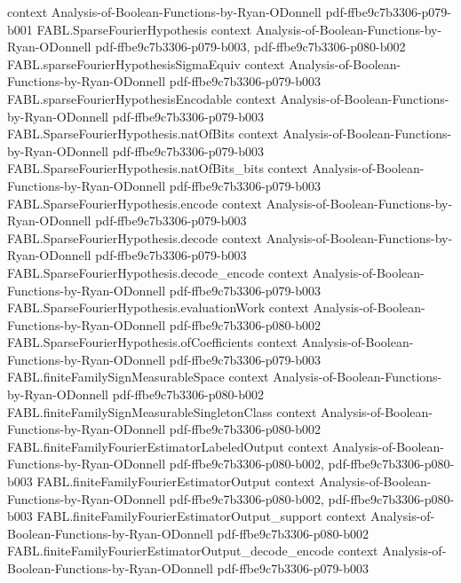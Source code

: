 \begin{theorem}
  {context}
  {Analysis-of-Boolean-Functions-by-Ryan-ODonnell}
  {pdf-ffbe9c7b3306-p079-b001}
\proofstep
  {FABL.SparseFourierHypothesis}
  {context}
  {Analysis-of-Boolean-Functions-by-Ryan-ODonnell}
  {pdf-ffbe9c7b3306-p079-b003,
    pdf-ffbe9c7b3306-p080-b002}
\proofstep
  {FABL.sparseFourierHypothesisSigmaEquiv}
  {context}
  {Analysis-of-Boolean-Functions-by-Ryan-ODonnell}
  {pdf-ffbe9c7b3306-p079-b003}
\proofstep
  {FABL.sparseFourierHypothesisEncodable}
  {context}
  {Analysis-of-Boolean-Functions-by-Ryan-ODonnell}
  {pdf-ffbe9c7b3306-p079-b003}
\proofstep
  {FABL.SparseFourierHypothesis.natOfBits}
  {context}
  {Analysis-of-Boolean-Functions-by-Ryan-ODonnell}
  {pdf-ffbe9c7b3306-p079-b003}
\proofstep
  {FABL.SparseFourierHypothesis.natOfBits_bits}
  {context}
  {Analysis-of-Boolean-Functions-by-Ryan-ODonnell}
  {pdf-ffbe9c7b3306-p079-b003}
\proofstep
  {FABL.SparseFourierHypothesis.encode}
  {context}
  {Analysis-of-Boolean-Functions-by-Ryan-ODonnell}
  {pdf-ffbe9c7b3306-p079-b003}
\proofstep
  {FABL.SparseFourierHypothesis.decode}
  {context}
  {Analysis-of-Boolean-Functions-by-Ryan-ODonnell}
  {pdf-ffbe9c7b3306-p079-b003}
\proofstep
  {FABL.SparseFourierHypothesis.decode_encode}
  {context}
  {Analysis-of-Boolean-Functions-by-Ryan-ODonnell}
  {pdf-ffbe9c7b3306-p079-b003}
\proofstep
  {FABL.SparseFourierHypothesis.evaluationWork}
  {context}
  {Analysis-of-Boolean-Functions-by-Ryan-ODonnell}
  {pdf-ffbe9c7b3306-p080-b002}
\proofstep
  {FABL.SparseFourierHypothesis.ofCoefficients}
  {context}
  {Analysis-of-Boolean-Functions-by-Ryan-ODonnell}
  {pdf-ffbe9c7b3306-p079-b003}
\proofstep
  {FABL.finiteFamilySignMeasurableSpace}
  {context}
  {Analysis-of-Boolean-Functions-by-Ryan-ODonnell}
  {pdf-ffbe9c7b3306-p080-b002}
\proofstep
  {FABL.finiteFamilySignMeasurableSingletonClass}
  {context}
  {Analysis-of-Boolean-Functions-by-Ryan-ODonnell}
  {pdf-ffbe9c7b3306-p080-b002}
\proofstep
  {FABL.finiteFamilyFourierEstimatorLabeledOutput}
  {context}
  {Analysis-of-Boolean-Functions-by-Ryan-ODonnell}
  {pdf-ffbe9c7b3306-p080-b002,
    pdf-ffbe9c7b3306-p080-b003}
\proofstep
  {FABL.finiteFamilyFourierEstimatorOutput}
  {context}
  {Analysis-of-Boolean-Functions-by-Ryan-ODonnell}
  {pdf-ffbe9c7b3306-p080-b002,
    pdf-ffbe9c7b3306-p080-b003}
\proofstep
  {FABL.finiteFamilyFourierEstimatorOutput_support}
  {context}
  {Analysis-of-Boolean-Functions-by-Ryan-ODonnell}
  {pdf-ffbe9c7b3306-p080-b002}
\proofstep
  {FABL.finiteFamilyFourierEstimatorOutput_decode_encode}
  {context}
  {Analysis-of-Boolean-Functions-by-Ryan-ODonnell}
  {pdf-ffbe9c7b3306-p079-b003}
\proofstep

\end{theorem}
